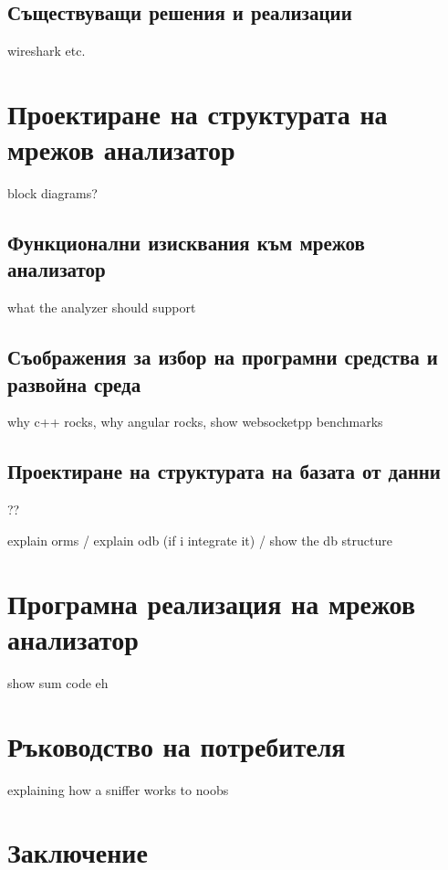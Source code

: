 \documentclass[12pt,a4paper,oneside]{book}
\begin{document}
\section{Съществуващи решения и реализации}
wireshark etc.

\chapter{Проектиране на структурата на мрежов анализатор}

block diagrams?
\section{Функционални изисквания към мрежов анализатор}

what the analyzer should support

\section{Съображения за избор на програмни средства и развойна среда}

why c++ rocks, why angular rocks, show websocketpp benchmarks

\section{Проектиране на структурата на базата от данни}

??

explain orms / explain odb (if i integrate it) / show the db structure

\chapter{Програмна реализация на мрежов анализатор}

show sum code eh

\chapter{Ръководство на потребителя}

explaining how a sniffer works to noobs

\chapter{Заключение}
\end{document}
